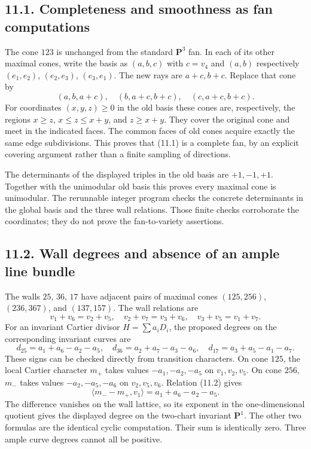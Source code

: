 \documentclass[
  10pt,
]{article}
\begin{document}
\subsection{11.1. Completeness and smoothness as fan
computations}\label{completeness-and-smoothness-as-fan-computations}

The cone \(123\) is unchanged from the standard \(\mathbf P^3\) fan. In
each of its other maximal cones, write the basis as \((a,b,c)\) with
\(c=v_4\) and \((a,b)\) respectively \((e_1,e_2)\), \((e_2,e_3)\),
\((e_3,e_1)\). The new rays are \(a+c,b+c\). Replace that cone by \[
 (a,b,a+c),\quad (b,a+c,b+c),\quad(c,a+c,b+c).
\] For coordinates \((x,y,z)\geq0\) in the old basis these cones are,
respectively, the regions \(x\geq z\), \(x\leq z\leq x+y\), and
\(z\geq x+y\). They cover the original cone and meet in the indicated
faces. The common faces of old cones acquire exactly the same edge
subdivisions. This proves that (11.1) is a complete fan, by an explicit
covering argument rather than a finite sampling of directions.

The determinants of the displayed triples in the old basis are
\(+1,-1,+1\). Together with the unimodular old basis this proves every
maximal cone is unimodular. The rerunnable integer program checks the
concrete determinants in the global basis and the three wall relations.
Those finite checks corroborate the coordinates; they do not prove the
fan-to-variety assertions.

\subsection{11.2. Wall degrees and absence of an ample line
bundle}\label{wall-degrees-and-absence-of-an-ample-line-bundle}

The walls \(25\), \(36\), \(17\) have adjacent pairs of maximal cones
\((125,256)\), \((236,367)\), and \((137,157)\). The wall relations are
\[
 v_1+v_6=v_2+v_5,\quad v_2+v_7=v_3+v_6,\quad v_3+v_5=v_1+v_7.
 \tag{11.2}
\] For an invariant Cartier divisor \(H=\sum a_iD_i\), the proposed
degrees on the corresponding invariant curves are \[
 d_{25}=a_1+a_6-a_2-a_5,\quad
 d_{36}=a_2+a_7-a_3-a_6,\quad
 d_{17}=a_3+a_5-a_1-a_7.
 \tag{11.3}
\] These signs can be checked directly from transition characters. On
cone \(125\), the local Cartier character \(m_+\) takes values
\(-a_1,-a_2,-a_5\) on \(v_1,v_2,v_5\). On cone \(256\), \(m_-\) takes
values \(-a_2,-a_5,-a_6\) on \(v_2,v_5,v_6\). Relation (11.2) gives \[
 \langle m_--m_+,v_1\rangle=a_1+a_6-a_2-a_5.
\] The difference vanishes on the wall lattice, so its exponent in the
one-dimensional quotient gives the displayed degree on the two-chart
invariant \(\mathbf P^1\). The other two formulas are the identical
cyclic computation. Their sum is identically zero. Three ample curve
degrees cannot all be positive.
\end{document}

